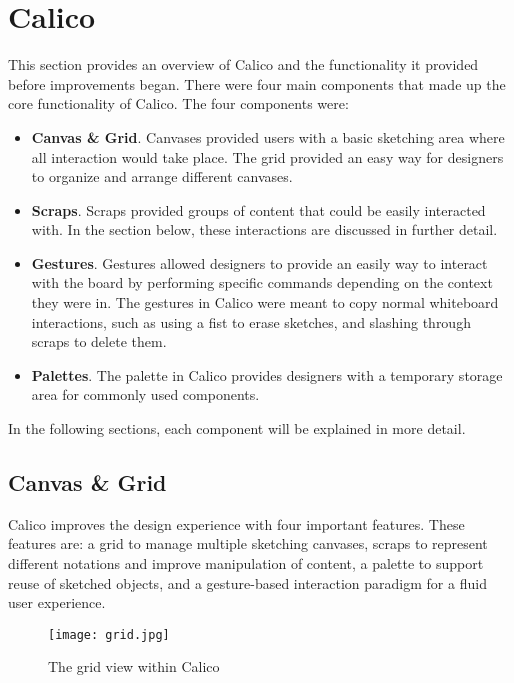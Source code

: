 \chapter{Calico}
This section provides an overview of Calico and the functionality it provided before improvements began. There were four main components that made up the core functionality of Calico. The four components were:

\begin{itemize}\itemsep1pt

\item
\textbf{Canvas \& Grid}. 
Canvases provided users with a basic sketching area where all interaction would take place. The grid provided an easy way for designers to organize and arrange different canvases.

\item
\textbf{Scraps}.
Scraps provided groups of content that could be easily interacted with. In the section below, these interactions are discussed in further detail.

\item
\textbf{Gestures}.
Gestures allowed designers to provide an easily way to interact with the board by performing specific commands depending on the context they were in. The gestures in Calico were meant to copy normal whiteboard interactions, such as using a fist to erase sketches, and slashing through scraps to delete them.

\item
\textbf{Palettes}.
The palette in Calico provides designers with a temporary storage area for commonly used components.


\end{itemize}

In the following sections, each component will be explained in more detail.


\section{Canvas \& Grid}

Calico improves the design experience with four important features. These features are: a grid to manage multiple sketching canvases, scraps to represent different notations and improve manipulation of content, a palette to support reuse of sketched objects, and a gesture-based interaction paradigm for a fluid user experience.


\begin{figure}[htb]
  \centering
  \texttt{[image: grid.jpg]}
  \caption{The grid view within Calico}
  \label{fig:grid}
\end{figure}

